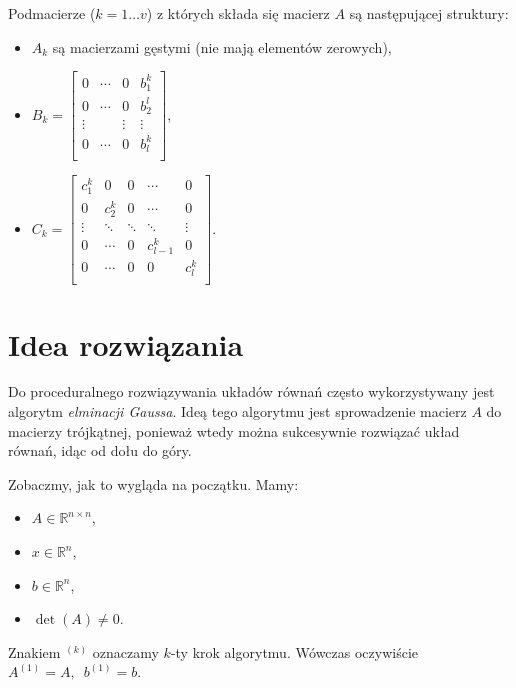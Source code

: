 \documentclass[10pt]{article}
\begin{document}
Podmacierze ($k = 1 \dots v$) z których składa się macierz $A$ są następującej struktury:
\begin{itemize}
    \item $A_k$ są macierzami gęstymi (nie mają elementów zerowych),
    \item
    $
    B_k =
    \begin{bmatrix}
        0 & \dotsb & 0 & b^k_1\\
        0 & \dotsb & 0 & b^l_2\\
        \vdots && \vdots & \vdots\\
        0 & \dotsb & 0 & b^k_l\\
    \end{bmatrix}
    $,
    \item
    $
    C_k =
    \begin{bmatrix}
        c^k_1 & 0 & 0 & \dotsb & 0\\
        0 & c^k_2 & 0 & \dotsb & 0\\
        \vdots & \ddots & \ddots & \ddots & \vdots\\
        0 & \dotsb & 0 & c^k_{l-1} & 0\\
        0 & \dotsb & 0 & 0 & c^k_l\\
    \end{bmatrix}
    $.
\end{itemize}

\section{Idea rozwiązania}

Do proceduralnego rozwiązywania układów równań często wykorzystywany jest algorytm \textit{elminacji Gaussa}. Ideą tego algorytmu jest sprowadzenie macierz $A$ do macierzy trójkątnej, ponieważ wtedy można sukcesywnie rozwiązać układ równań, idąc od dołu do góry.

\noindent Zobaczmy, jak to wygląda na początku. Mamy:
\begin{itemize}
    \item $A \in \mathbb{R}^{n\times n}$,
    \item $x \in \mathbb{R}^n$,
    \item $b \in \mathbb{R}^n$,
    \item $\det(A) \neq 0$.
\end{itemize}

Znakiem $^{(k)}$ oznaczamy $k$-ty krok algorytmu. Wówczas oczywiście $A^{(1)} = A,\enspace b^{(1)} = b$.
\end{document}
